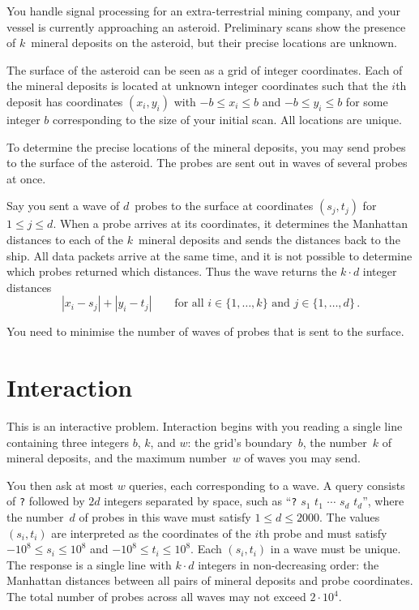 

\noindent
You handle signal processing for an extra-terrestrial mining company, and your vessel is currently approaching an asteroid. 
Preliminary scans show the presence of $k$~mineral deposits on the asteroid, but their precise locations are unknown.

\medskip

The surface of the asteroid can be seen as a grid of integer coordinates.
Each of the mineral deposits is located at unknown integer coordinates such that the $i$th deposit has coordinates $(x_i, y_i)$ with  
$-b \le x_i \le b$ and $-b\le y_i \le b$ %
for some integer $b$ corresponding to the size of your initial scan. All locations are unique.

To determine the precise locations of the mineral deposits, you may send probes to the surface of the asteroid. 
The probes are sent out in waves of several probes at once.

Say you sent a wave of $d$~probes to the surface at coordinates $(s_j,t_j)$ for $1\leq j\leq d$.
When a probe arrives at its coordinates, it determines the Manhattan distances to each of the $k$~mineral deposits and sends the distances back to the ship. 
All data packets arrive at the same time, and it is not possible to determine which probes returned which distances. 
Thus the wave returns the $k\cdot d$ integer distances
\[|x_i-s_j| + |y_i - t_j| \qquad\text{for all } i \in \{1,\ldots,k\} \text{ and } j \in\{ 1,\ldots,d\}\,.\]

You need to minimise the number of waves of probes that is sent to the surface.


\section*{Interaction}

This is an interactive problem.
Interaction begins with you reading a single line containing three integers $b$, $k$, and $w$:
the grid's boundary~$b$,
the number~$k$ of mineral deposits,
and the maximum number~$w$ of waves you may send.

You then ask at most $w$ queries, each corresponding to a wave.
A query consists of \texttt{?} followed by $2d$ integers separated by space, such as ``\texttt{?} $s_1$ $t_1$ $\cdots$ $s_d$ $t_d$'', where the number~$d$ of probes in this wave must satisfy
$1\leq d\leq 2000$. %
The values $(s_i,t_i)$ are interpreted as the coordinates of the $i$th probe and must satisfy
$-10^8 \leq s_i \leq 10^8$ and $-10^8 \leq t_i \leq 10^8$. %
Each $(s_i,t_i)$ in a wave must be unique.
The response is a single line with $k \cdot d$ integers in non-decreasing order: 
the Manhattan distances between all pairs of mineral deposits and probe coordinates.
The total number of probes across all waves may not exceed
$2\cdot 10^4.$ %

